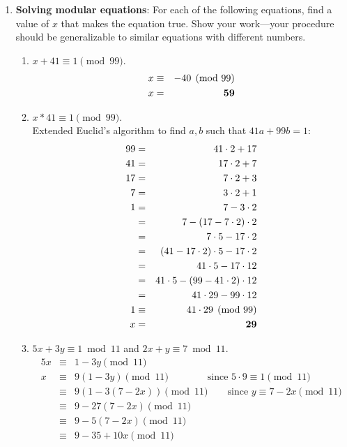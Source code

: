 \documentclass[11pt,fleqn]{article}
\begin{document}
\begin{enumerate}

\item \textbf{Solving modular equations}: For each of the following equations, find a value of $x$
that makes the equation true. 
Show your work---your procedure
should be generalizable to similar equations with different numbers.
\begin{enumerate}
\item $x + 41 \equiv 1 \pmod{99}$.
\begin{eqnarray*}
x & \equiv & -40 \pmod{99} \\
x & = & {\bf 59}
\end{eqnarray*}
\item $x * 41 \equiv 1 \pmod{99}$. \\
Extended Euclid's algorithm to find $a,b$ such that $41a + 99b = 1$:
\begin{eqnarray*}
99 & = & 41 \cdot 2 + 17 \\
41 & = & 17 \cdot 2 + 7 \\
17 & = & 7 \cdot 2 + 3 \\
7 & = & 3 \cdot 2 + 1 \\
1 & = & 7 - 3 \cdot 2 \\
  & = & 7 - (17 - 7 \cdot 2) \cdot 2 \\
  & = & 7 \cdot 5 - 17 \cdot 2 \\
  & = & (41 - 17 \cdot 2) \cdot 5 - 17 \cdot 2 \\
  & = & 41 \cdot 5 - 17 \cdot 12 \\
  & = & 41 \cdot 5 - (99 - 41 \cdot 2) \cdot 12 \\
  & = & 41 \cdot 29 - 99 \cdot 12 \\
1 & \equiv & 41 \cdot 29 \pmod{99} \\
x & = & {\bf 29}
\end{eqnarray*}
\item $5x + 3y \equiv 1 \bmod 11$ and $2x + y \equiv 7 \bmod 11$.
\begin{eqnarray*}
5x & \equiv & 1-3y \pmod{11} \\
 x & \equiv & 9(1-3y) \pmod{11} \qquad \qquad \text{since } 5 \cdot 9 \equiv 1 \pmod{11} \\
 & \equiv & 9(1-3(7-2x)) \pmod{11} \qquad \text{since } y \equiv 7-2x \pmod{11} \\
 & \equiv & 9-27(7-2x) \pmod{11} \\
 & \equiv & 9-5(7-2x) \pmod{11} \\
 & \equiv & 9-35+10x \pmod{11} \\

\end{eqnarray*}
\end{enumerate}
\end{enumerate}
\end{document}
